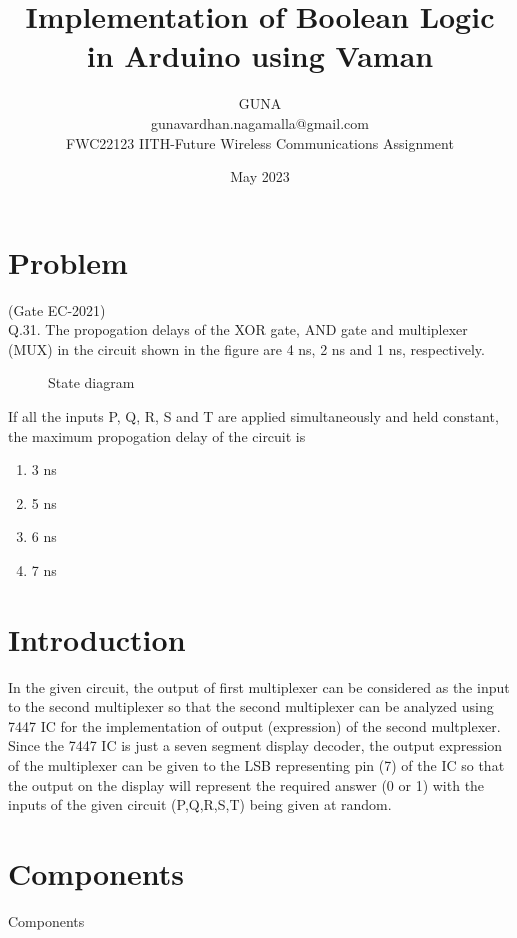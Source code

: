 \documentclass{article}
\title{Implementation of Boolean Logic in Arduino
using Vaman
}
\date{May 2023}
\author{GUNA\\gunavardhan.nagamalla@gmail.com\\ FWC22123 IITH-Future Wireless Communications Assignment}
\begin{document}
\maketitle
	\tableofcontents
	
	\pagebreak

\section{Problem} 
		(Gate EC-2021)\\
Q.31. The propogation delays of the XOR gate, AND gate and multiplexer (MUX) in the circuit shown in the figure are 4 ns, 2 ns and 1 ns, respectively.\\
\begin{figure}[h]
  
  \caption{State diagram}
  \label{fig:1}		
  \end{figure}

If all the inputs P, Q, R, S and T are applied simultaneously and held constant, the maximum propogation delay of the circuit is
\begin{enumerate}
	\item 3 ns \item 5 ns \item 6 ns \item 7 ns
\end{enumerate}
\section{Introduction}
		In the given circuit, the output of first multiplexer can be considered as the input to the second multiplexer so that the second multiplexer can be analyzed using 7447 IC for the implementation of output (expression) of the second multplexer. Since the 7447 IC is just a seven segment display decoder, the output expression of the multiplexer can be given to the LSB representing pin (7) of the IC so that the output on the display will represent the required answer (0 or 1) with the inputs of the given circuit (P,Q,R,S,T) being given at random.
\section{Components}

\begin{table}[h]
\centering

\caption{Components}
\label{table:Components}
\end{table}

		
\end{document}
